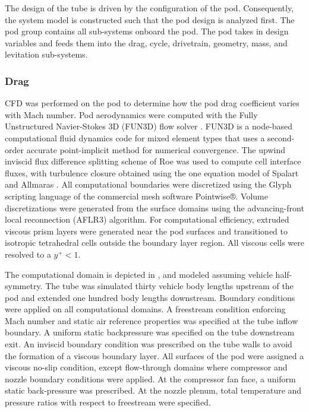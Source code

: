 
	 The design of the tube is driven by the configuration of the pod.
	 Consequently, the system model is constructed such that the pod design is analyzed first.
	 The pod group contains all sub-systems onboard the pod.
	 The pod takes in design variables and feeds them into the drag, cycle,
	 drivetrain, geometry, mass, and levitation sub-systems.

\subsubsection{Drag}
	CFD was performed on the pod to determine how the pod drag coefficient varies with Mach number.
	Pod aerodynamics were computed with the Fully Unstructured Navier-Stokes 3D
	(FUN3D) flow solver \cite{Biedron}. FUN3D is a node-based computational fluid dynamics
	code for mixed element types that uses a second-order accurate point-implicit
	method for numerical convergence. The upwind inviscid flux difference
	splitting scheme of Roe \cite{Roe} was used to compute cell interface fluxes,
	with turbulence closure obtained using the one equation model of Spalart
	and Allmaras \cite{Spalart}.
	All computational boundaries were discretized using the Glyph scripting
	language of the commercial mesh software Pointwise®. Volume discretizations
	were generated from the surface domains using the advancing-front local
	reconnection (AFLR3)\cite{Marcum} algorithm. For computational efficiency, extruded
	viscous prism layers were generated near the pod surfaces and transitioned
	to isotropic tetrahedral cells outside the boundary layer region.
	All viscous cells were resolved to a $y^{+} < 1$. %

	The computational domain is depicted in ,
	and modeled assuming vehicle half-symmetry.
	The tube was simulated thirty vehicle body lengths upstream of the pod
	and extended one hundred body lengths downstream. Boundary conditions were
	applied on all computational domains. A freestream condition enforcing Mach
	number and static air reference properties was specified at the tube inflow boundary.
	A uniform static backpressure was specified on the tube downstream exit.
	An inviscid boundary condition was prescribed on the tube walls to avoid
	the formation of a viscous boundary layer. All surfaces of the pod were
	assigned a viscous no-slip condition, except flow-through domains where
	compressor and nozzle boundary conditions were applied. At the compressor
	fan face, a uniform static back-pressure was prescribed. At the nozzle plenum,
	total temperature and pressure ratios with respect to freestream were specified.

